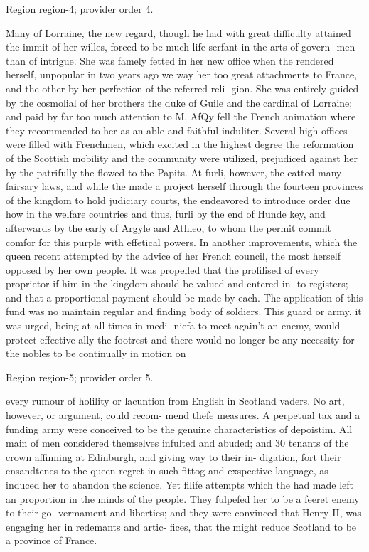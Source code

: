 \documentclass[11pt]{article}
\begin{document}
{\scriptsize\color{gray} Region region-4; provider order 4.\par}
\medskip

Many of Lorraine, the new regard, though he had with great difficulty attained the immit of her willes, forced to be much life serfant in the arts of govern- men than of intrigue. She was famely fetted in her new office when the rendered herself, unpopular in two years ago we way her too great attachments to France, and the other by her perfection of the referred reli- gion. She was entirely guided by the cosmolial of her brothers the duke of Guile and the cardinal of Lorraine; and paid by far too much attention to M. AfQy fell the French animation where they recommended to her as an able and faithful induliter. Several high offices were filled with Frenchmen, which excited in the highest degree the reformation of the Scottish mobility and the community were utilized, prejudiced against her by the patrifully the flowed to the Papits. At furli, however, the catted many fairsary laws, and while the made a project herself through the fourteen provinces of the kingdom to hold judiciary courts, the endeavored to introduce order due how in the welfare countries and thus, furli by the end of Hunde key, and afterwards by the early of Argyle and Athleo, to whom the permit commit comfor for this purple with effetical powers. In another improvements, which the queen recent attempted by the advice of her French council, the most herself opposed by her own people. It was propelled that the profilised of every proprietor if him in the kingdom should be valued and entered in- to registers; and that a proportional payment should be made by each. The application of this fund was no maintain regular and finding body of soldiers. This guard or army, it was urged, being at all times in medi- niefa to meet again’t an enemy, would protect effective ally the footrest and there would no longer be any necessity for the nobles to be continually in motion on
\par

{\scriptsize\color{gray} Region region-5; provider order 5.\par}
\medskip

every rumour of holility or lacuntion from English in Scotland vaders. No art, however, or argument, could recom- mend thefe measures. A perpetual tax and a funding army were conceived to be the genuine characteristics of depoistim. All main of men considered themselves infulted and abuded; and 30 tenants of the crown affinning at Edinburgh, and giving way to their in- digation, fort their ensandtenes to the queen regret in such fittog and exspective language, as induced her to abandon the science. Yet filife attempts which the had made left an proportion in the minds of the people. They fulpefed her to be a feeret enemy to their go- vermament and liberties; and they were convinced that Henry II, was engaging her in redemants and artic- fices, that the might reduce Scotland to be a province of France.
\par
\end{document}
